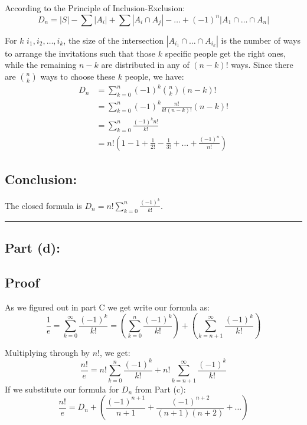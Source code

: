 \documentclass[answers]{exam}
\begin{document}
\begin{questions}
\begin{parts}
\begin{solution}
            According to the Principle of Inclusion-Exclusion:
            \[ D_n = |S| - \sum |A_i| + \sum |A_i \cap A_j| - \dots + (-1)^n |A_1 \cap \dots \cap A_n| \]
            
            For $k$ $i_1, i_2, \dots, i_k$, the size of the intersection $|A_{i_1} \cap \dots \cap A_{i_k}|$ is the number of ways to arrange the invitations such that those $k$ specific people get the right ones, while the remaining $n-k$ are distributed in any of $(n-k)!$ ways. Since there are $\binom{n}{k}$ ways to choose these $k$ people, we have:
            \begin{align*}
                D_n &= \sum_{k=0}^n (-1)^k \binom{n}{k} (n-k)! \\
                &= \sum_{k=0}^n (-1)^k \frac{n!}{k!(n-k)!} (n-k)! \\
                &= \sum_{k=0}^n \frac{(-1)^k n!}{k!} \\
                &= n! \left( 1 - 1 + \frac{1}{2!} - \frac{1}{3!} + \dots + \frac{(-1)^n}{n!} \right)
            \end{align*}

            \subsection*{Conclusion:}
            The closed formula is $D_n = n! \sum_{k=0}^n \frac{(-1)^k}{k!}$.

            \noindent\rule{\textwidth}{0.4pt} 

            \subsection*{Part (d):}
            \subsection*{Proof}
			As we figured out in part C we get write our formula as:
            \[ \frac{1}{e} = \sum_{k=0}^{\infty} \frac{(-1)^k}{k!} = \left( \sum_{k=0}^{n} \frac{(-1)^k}{k!} \right) + \left( \sum_{k=n+1}^{\infty} \frac{(-1)^k}{k!} \right) \]
            
            Multiplying through by $n!$, we get:
            \[ \frac{n!}{e} = n! \sum_{k=0}^{n} \frac{(-1)^k}{k!} + n! \sum_{k=n+1}^{\infty} \frac{(-1)^k}{k!} \]
            If we substitute our formula for $D_n$ from Part (c):
            \[ \frac{n!}{e} = D_n + \left( \frac{(-1)^{n+1}}{n+1} + \frac{(-1)^{n+2}}{(n+1)(n+2)} + \dots \right) \]
            

\end{solution}
\end{parts}
\end{questions}
\end{document}
